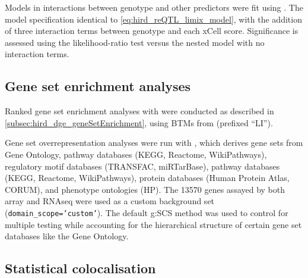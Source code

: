 Models in interactions between genotype and other predictors were fit using .
The model specification identical to \cref{eq:hird_reQTL_limix_model}, with the addition of three interaction terms between genotype and each xCell score.
Significance is assessed using the likelihood-ratio test versus the nested model with no interaction terms.



\subsection{Gene set enrichment analyses}

Ranked gene set enrichment analyses with  were conducted as described in \cref{subsec:hird_dge_geneSetEnrichment},
using \glspl{BTM} from \textcite{li2013MolecularSignaturesAntibody} (prefixed \enquote{LI}).

Gene set overrepresentation analyses were run with  \autocite{raudvere2019ProfilerWebServer},
which derives gene sets from
    Gene Ontology,
    pathway databases (KEGG, Reactome, WikiPathways),
    regulatory motif databases (TRANSFAC, miRTarBase),
    pathway databases (KEGG, Reactome, WikiPathways),
    protein databases (Human Protein Atlas, CORUM),
    and phenotype ontologies (HP).
The 13570 genes assayed by both array and \gls{RNAseq} were used as a custom background set (\texttt{domain\_scope='custom'}).
The default g:SCS method was used to control for multiple testing while accounting for the hierarchical structure of certain gene set databases like the Gene Ontology.

\subsection{Statistical colocalisation}
\label{subsec:hird_reQTL_coloc}

